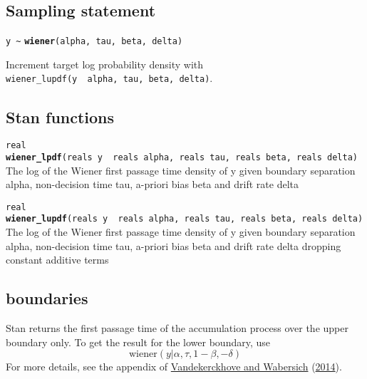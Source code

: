\documentclass[
  10pt,
]{book}
\begin{document}
\hypertarget{sampling-statement-44}{%
\subsection{Sampling statement}\label{sampling-statement-44}}

\texttt{y\ \textasciitilde{}} \textbf{\texttt{wiener}}\texttt{(alpha,\ tau,\ beta,\ delta)}

Increment target log probability density with \texttt{wiener\_lupdf(y\ \textbar{}\ alpha,\ tau,\ beta,\ delta)}.

\hypertarget{stan-functions-43}{%
\subsection{Stan functions}\label{stan-functions-43}}


\texttt{real} \textbf{\texttt{wiener\_lpdf}}\texttt{(reals\ y\ \textbar{}\ reals\ alpha,\ reals\ tau,\ reals\ beta,\ reals\ delta)}\newline
The log of the Wiener first passage time density of y given boundary
separation alpha, non-decision time tau, a-priori bias beta and drift
rate delta


\texttt{real} \textbf{\texttt{wiener\_lupdf}}\texttt{(reals\ y\ \textbar{}\ reals\ alpha,\ reals\ tau,\ reals\ beta,\ reals\ delta)}\newline
The log of the Wiener first passage time density of y given boundary
separation alpha, non-decision time tau, a-priori bias beta and drift
rate delta dropping constant additive terms

\hypertarget{boundaries}{%
\subsection{boundaries}\label{boundaries}}

Stan returns the first passage time of the accumulation process over
the upper boundary only. To get the result for the lower boundary, use
\[ \text{wiener}(y | \alpha, \tau, 1 - \beta, - \delta) \] For more
details, see the appendix of \protect\hyperlink{ref-Vandekerckhove-Wabersich:2014}{Vandekerckhove and Wabersich} (\protect\hyperlink{ref-Vandekerckhove-Wabersich:2014}{2014}).
\end{document}
